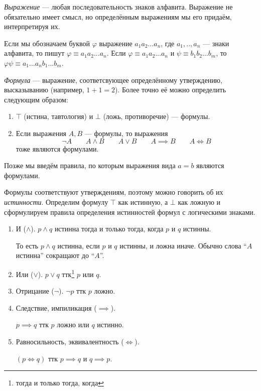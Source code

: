 {\it Выражение} --- любая последовательность знаков алфавита.
Выражение не обязательно имеет смысл, но определённым выражениям мы его придаём,
интерпретируя их.

Если мы обозначаем буквой $\varphi$ выражение $a_1a_2...a_{n}$,
где $a_1,..,a_{n}$ --- знаки алфавита, то пишут $\varphi\equiv a_1a_2...a_{n}$.
Если $\varphi\equiv a_1a_2...a_{n}$ и $\psi\equiv b_1b_2...b_{m}$,
то $\varphi\psi\equiv a_1...a_{n}b_1...b_{m}$.


	{\it Формула} --- выражение, соответсвующее определённому утверждению, высказыванию
(например, $1+1=2$). Более точно её можно определить следующим образом:
\begin{enumerate}
	\item{}$\top$ (истина, тавтология) и $\bot$ (ложь, противоречие) --- формулы.
	\item{}Если выражения $A,B$ --- формулы, то выражения
	\[
		\lnot A\qquad A\land B\qquad A\lor B\qquad A\implies B\qquad A\iff B
	\]
	тоже являются формулами.
\end{enumerate}
Позже мы введём правила, по которым выражения
вида $a=b$ являются формулами.

Формулы соответствуют утверждениям, поэтому можно говорить об их {\it истинности}.
Определим формулу $\top$ как истинную, а $\bot$ как ложную и
сформулируем правила определения истинностей формул с логическими знаками.
\begin{enumerate}
	\item{}И ($\land$). $p\land q$ истинна тогда и только тогда, когда $p$ и $q$ истинны.

	То есть $p\land q$ истинна, если $p$ и $q$ истинны,
	и ложна иначе. Обычно слова ``$A$ истинна'' сокращают до ``$A$''.

	\item{}Или ($\lor$). $p\lor q$ ттк\footnote{тогда и только тогда, когда} $p$ или $q$.

	\item{}Отрицание ($\lnot$). $\lnot p$ ттк $p$ ложно.

	\item{}Следствие, импиликация ($\implies$).

	$p\implies q$ ттк $p$ ложно или $q$ истинно.

	\item{}Равносильность, эквивалентность ($\iff$).

	$(p\iff q)$ ттк $p\implies q$ и $q\implies p$.
\end{enumerate}

